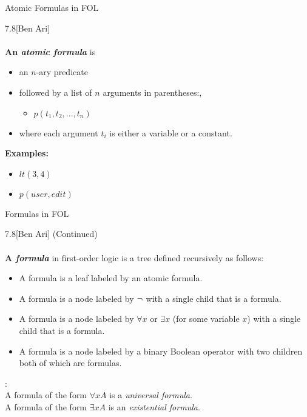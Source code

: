 \begin{wideslide}[bm=,toc=]{Atomic Formulas in FOL}
\begin{defn}{7.8}[Ben Ari]
~\\~\\
\textbf{ An \emph{atomic formula}} is
\begin{itemize}
\item<2-> an $n$-ary predicate 
\item<3-> followed by a list of $n$ arguments in parentheses:, 
\begin{itemize}
\item<4-> $p(t_1,t_2,...,t_n)$
\end{itemize}
\item<5-> where each argument $t_i$ is either a variable or a constant. 
\end{itemize}
\pause[5]
\textbf{Examples:}
\begin{itemize}
\item $lt(3,4)$
\item $p(user, edit)$
\end{itemize}

\end{defn}
\end{wideslide}


\begin{wideslide}[bm=,toc=]{Formulas in FOL}
\begin{defn}{7.8}[Ben Ari] (Continued)\\~\\
\textbf{ A \emph{formula}} in first-order logic is
a tree defined recursively as follows:
\end{defn}
\vspace{-3ex}
\begin{itemize}
\item<2-> A formula is a leaf labeled by an atomic formula.
\item<3-> A formula is a node labeled by $\mathop{\neg}$ with a single child that is a
formula.
\item<4-> A formula is a node labeled by $\forall x$ or $\exists x$ (for some
 variable $x$) with a single child that is a formula.
\item<5-> A formula is a node labeled by a binary Boolean operator with two
children both of which are formulas.
\end{itemize}
:\\
A formula of the form $\forall x A$ is a \emph{universal formula}.\\
A formula of the form $\exists x A$ is an \emph{existential formula}.\\
\end{wideslide}

